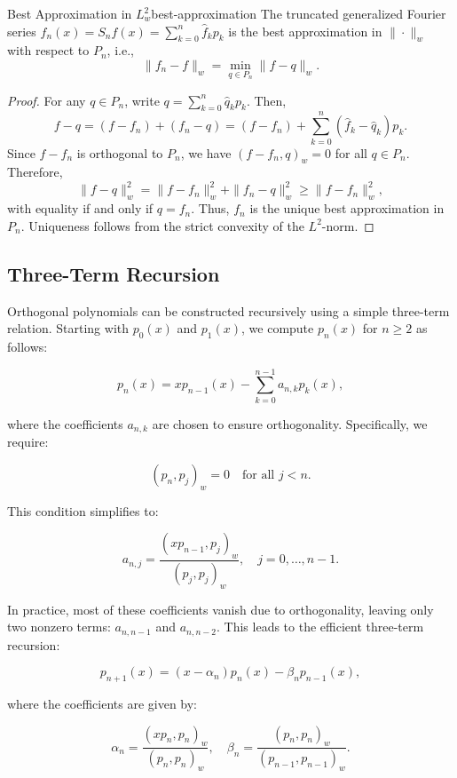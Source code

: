 \begin{theorem}{Best Approximation in $L^2_w$}{best-approximation}
    The truncated generalized Fourier series $f_n(x) = S_n f(x) = \sum_{k=0}^n \hat{f}_k p_k$ is the best approximation in $\|\cdot\|_w$ with respect to $P_n$, i.e.,
    \[
        \|f_n - f\|_w = \min_{q \in P_n} \|f - q\|_w.
    \]
\end{theorem}
\begin{proof}
    For any $q \in P_n$, write $q = \sum_{k=0}^n \hat{q}_k p_k$. Then,
    \[
        f - q = (f - f_n) + (f_n - q) = (f - f_n) + \sum_{k=0}^n (\hat{f}_k - \hat{q}_k) p_k.
    \]
    Since $f - f_n$ is orthogonal to $P_n$, we have $(f - f_n, q)_w = 0$ for all $q \in P_n$. Therefore,
    \[
        \|f - q\|_w^2 = \|f - f_n\|_w^2 + \|f_n - q\|_w^2 \geq \|f - f_n\|_w^2,
    \]
    with equality if and only if $q = f_n$. Thus, $f_n$ is the unique best approximation in $P_n$.
    Uniqueness follows from the strict convexity of the $L^2$-norm.
\end{proof}

\subsection{Three-Term Recursion}
\label{subsec:three-term}

Orthogonal polynomials can be constructed recursively using a simple three-term relation. Starting with $p_0(x)$ and $p_1(x)$, we compute $p_n(x)$ for $n \geq 2$ as follows:

\[
    p_n(x) = x p_{n-1}(x) - \sum_{k=0}^{n-1} a_{n,k} p_k(x),
\]

where the coefficients $a_{n,k}$ are chosen to ensure orthogonality. Specifically, we require:

\[
    (p_n, p_j)_w = 0 \quad \text{for all } j < n.
\]

This condition simplifies to:

\[
    a_{n,j} = \frac{(x p_{n-1}, p_j)_w}{(p_j, p_j)_w}, \quad j = 0, \ldots, n-1.
\]

In practice, most of these coefficients vanish due to orthogonality, leaving only two nonzero terms: $a_{n,n-1}$ and $a_{n,n-2}$. This leads to the efficient three-term recursion:

\[
    p_{n+1}(x) = (x - \alpha_n) p_n(x) - \beta_n p_{n-1}(x),
\]

where the coefficients are given by:

\[
    \alpha_n = \frac{(x p_n, p_n)_w}{(p_n, p_n)_w}, \quad \beta_n = \frac{(p_n, p_n)_w}{(p_{n-1}, p_{n-1})_w}.
\]

